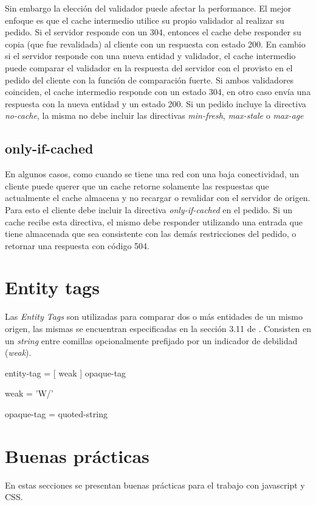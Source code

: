 \documentclass[a4paper,12pt]{report}
\begin{document}
Sin embargo la elección del validador puede afectar la performance. El mejor enfoque es que el cache intermedio utilice su propio validador al realizar su pedido. Si
el servidor responde con un 304, entonces el cache debe responder su copia (que fue revalidada) al cliente con un respuesta con estado 200. En cambio si el servidor responde
con una nueva entidad y validador, el cache intermedio puede comparar el validador en la respuesta del servidor con el provisto en el pedido del cliente con la función de comparación
fuerte. Si ambos validadores coinciden, el cache intermedio responde con un estado 304, en otro caso envía una respuesta con la nueva entidad y un estado 200.
Si un pedido incluye la directiva \emph{no-cache}, la misma no debe incluir las directivas \emph{min-fresh}, \emph{max-stale} o \emph{max-age}

\subsection{only-if-cached}
En algunos casos, como cuando se tiene una red con una baja conectividad, un cliente puede querer que un cache retorne solamente las respuestas que actualmente el cache
almacena y no recargar o revalidar con el servidor de origen. Para esto el cliente debe incluir la directiva \emph{only-if-cached} en el pedido. Si un cache recibe esta
directiva, el mismo debe responder utilizando una entrada que tiene almacenada que sea consistente con las demás restricciones del pedido, o retornar una respuesta con
código 504.

\section{Entity tags}
Las \emph{Entity Tags} son utilizadas para comparar dos o más entidades de un mismo origen, las mismas se encuentran especificadas en la sección
3.11 de \cite{rfc2616}. Consisten en un \emph{string} entre comillas opcionalmente prefijado por un
indicador de debilidad (\emph{weak}).

      entity-tag = [ weak ] opaque-tag

      weak       = 'W/'

      opaque-tag = quoted-string

\section{Buenas prácticas}
En estas secciones se presentan buenas prácticas para el trabajo con javascript y CSS.


\end{document}
